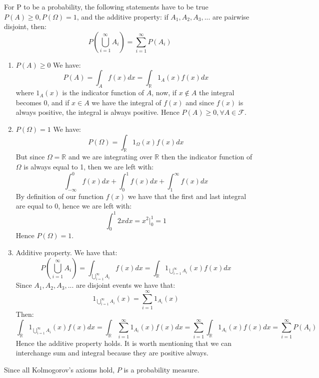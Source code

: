 \documentclass{article}
\begin{document}
    \begin{minipage}{\linewidth}
        \begin{solutions}
            For P to be a probability, the following statements have to be true $P(A) \geq 0, P(\Omega) = 1$, and the additive property: if $A_ 1, A_2, A_3, ...$ are pairwise disjoint, then: 
                \[  
                    P(\bigcup_{i = 1}^{\infty} A_i) = \sum_{i = 1}^{\infty} P(A_i)
                \]
                \begin{enumerate}
                    \item $P(A) \geq 0$ We have: 
                    \[
                        P(A) =\int_{A}f(x)dx = \int_{\mathbb{R}}1_A(x)f(x)dx
                    \]
                    where $1_A(x)$ is the indicator function of $A$, now, if $x \notin A$ the integral becomes 0, and if $x \in A$ we have the integral of $f(x)$ and since $f(x)$ is always positive, the integral is always positive. Hence $P(A) \geq 0, \forall A \in \mathcal{F}$.
                    \item $P(\Omega) = 1$ We have: 
                    \[
                        P(\Omega) = \int_{\mathbb{R}} 1_\Omega(x) f(x) dx
                    \]
                    But since $\Omega = \mathbb{R}$ and we are integrating over $\mathbb{R}$ then the indicator function of $\Omega$ is always equal to 1, then we are left with:
                    \[
                        \int_{-\infty}^{0} f(x)dx + \int_{0}^{1}f(x)dx + \int_{1}^{\infty} f(x)dx
                    \]
                    By definition of our function $f(x)$ we have that the first and last integral are equal to 0, hence we are left with:
                    \[
                        \int_{0}^{1} 2xdx = x^2\Big|_0^1 = 1
                    \]
                    Hence $P(\Omega) = 1$.
                    \item Additive property. We have that:
                    \[
                        P(\bigcup_{i = 1}^{\infty}A_i) =\int_{\bigcup_{i = 1}^{\infty}A_i} f(x)dx = \int_{\mathbb{R}} 1_{\bigcup_{i = 1}^{\infty} A_i}(x) f(x)dx 
                    \]
                    Since $A_1, A_2, A_3, ...$ are disjoint events we have that:
                    \[
                        1_{\bigcup_{i = 1}^{\infty} A_i}(x) = \sum_{i = 1}^{\infty}1_{A_i}(x)
                    \]
                    Then:
                    \[
                        \int_{\mathbb{R}} 1_{\bigcup_{i = 1}^{\infty} A_i}(x) f(x)dx = \int_{\mathbb{R}} \sum_{i = 1}^{\infty}1_{A_i}(x)f(x)dx =  \sum_{i = 1}^{\infty} \int_{\mathbb{R}} 1_{A_i}(x)f(x)dx = \sum_{i = 1}^{\infty} P(A_i) 
                    \]
                    Hence the additive property holds.
                    It is worth mentioning that we can interchange sum and integral because they are positive always. 
                \end{enumerate}
                Since all Kolmogorov's axioms hold, $P$ is a probability measure. 
        \end{solutions}
    \end{minipage}
\end{document}
